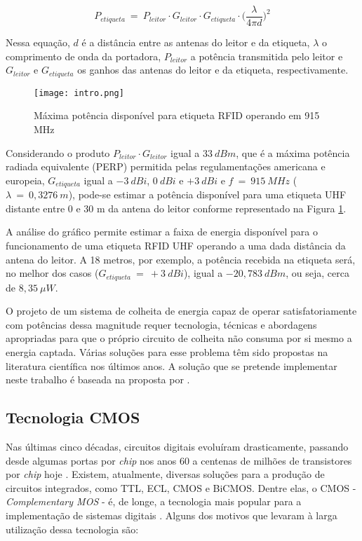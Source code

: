 \begin{equation}
	\label{eq:friis}
	P_{etiqueta}~=~P_{leitor} \cdot G_{leitor} \cdot G_{etiqueta} \cdot \Big ( \dfrac{\lambda}{4 \pi d} \Big )^2
\end{equation}

Nessa equação, $d$ é a distância entre as antenas do leitor e da etiqueta, $\lambda$ o comprimento de onda da portadora, $P_{leitor}$ a potência transmitida pelo leitor e $G_{leitor}$ e $G_{etiqueta}$ os ganhos das antenas do leitor e da etiqueta, respectivamente.

\begin{figure}[!htb]
	\caption{\label{fig:intro}Máxima potência disponível para etiqueta RFID operando em 915 MHz}
	\begin{center}
		\texttt{[image: intro.png]}
	\end{center}
\end{figure}

Considerando o produto $P_{leitor} \cdot G_{leitor}$ igual a $33~dBm$, que é a máxima potência radiada equivalente (PERP) permitida pelas regulamentações americana e europeia, $G_{etiqueta}$ igual a $-3~dBi$, $0~dBi$ e $+3~dBi$ e $f~=~915~MHz$ ($\lambda~=~0,3276~m$), pode-se estimar a potência disponível para uma etiqueta UHF distante entre 0 e 30 m da antena do leitor conforme representado na Figura \ref{fig:intro}.

A análise do gráfico permite estimar a faixa de energia disponível para o funcionamento de uma etiqueta RFID UHF operando a uma dada distância da antena do leitor. A 18 metros, por exemplo, a potência recebida na etiqueta será, no melhor dos casos ($G_{etiqueta}~=~+3~dBi$), igual a $-20,783~dBm$, ou seja, cerca de $8,35~\mu W$.

O projeto de um sistema de colheita de energia capaz de operar satisfatoriamente com potências dessa magnitude requer tecnologia, técnicas e abordagens apropriadas para que o próprio circuito de colheita não consuma por si mesmo a energia captada. Várias soluções para esse problema têm sido propostas na literatura científica nos últimos anos. A solução que se pretende implementar neste trabalho é baseada na proposta por .


\subsection{Tecnologia CMOS}
Nas últimas cinco décadas, circuitos digitais evoluíram drasticamente, passando desde algumas portas por \textit{chip} nos anos 60 a centenas de milhões de transistores por \textit{chip} hoje \cite{HAZAVI:2008}. Existem, atualmente, diversas soluções para a produção de circuitos integrados, como TTL, ECL, CMOS e BiCMOS. Dentre elas, o CMOS - \textit{Complementary MOS} - é, de longe, a tecnologia mais popular para a implementação de sistemas digitais \cite{SEDRA:2007}. Alguns dos motivos que levaram à larga utilização dessa tecnologia são:

